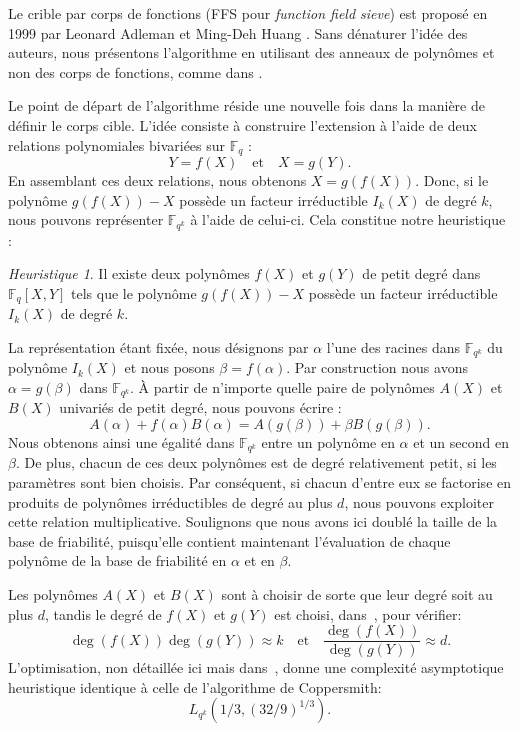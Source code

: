 \documentclass[a4paper, titlepage, 11pt]{article}
\theoremstyle{definition}
\theoremstyle{remark}
\newtheorem{heur}[theo]{Heuristique}
\def\gf #1{\mathbb{F}_{#1}}
\begin{document}
Le crible par corps de fonctions (FFS pour \textit{function field sieve}) est proposé en 1999 par Leonard Adleman et Ming-Deh Huang \cite{adleman1999}. Sans dénaturer l'idée des auteurs, nous présentons l'algorithme en utilisant des anneaux de polynômes et non des corps de fonctions, comme dans \cite{joux2013, joux2006, joux2002, pierrot2016}.

Le point de départ de l'algorithme réside une nouvelle fois dans la manière de définir le corps cible. L'idée consiste à construire l'extension à l'aide de deux relations polynomiales bivariées sur $\gf{q}$ : $$Y = f(X) \quad \text{et}\quad X = g(Y).$$
En assemblant ces deux relations, nous obtenons $X = g(f(X))$. Donc, si le polynôme $g(f(X)) - X$ possède un facteur irréductible $I_k(X)$ de degré $k$, nous pouvons représenter $\gf{q^k}$ à l'aide de celui-ci. Cela constitue notre heuristique :
\begin{heur}
Il existe deux polynômes $f(X)$ et $g(Y)$ de petit degré dans $\gf{q}[X, Y]$ tels que le polynôme $g(f(X)) - X$ possède un facteur irréductible $I_k(X)$ de degré $k$.
\end{heur}
La représentation étant fixée, nous désignons par $\alpha$ l'une des racines dans $\gf{q^k}$ du polynôme $I_k(X)$ et nous posons $\beta = f(\alpha)$. Par construction nous avons $\alpha = g(\beta)$ dans $\gf{q^k}$. À partir de n'importe quelle paire de polynômes $A(X)$ et $B(X)$ univariés de petit degré, nous pouvons écrire :
$$A(\alpha) + f(\alpha)B(\alpha) = A(g(\beta)) + \beta B(g(\beta)).$$
Nous obtenons ainsi une égalité dans $\gf{q^k}$ entre un polynôme en $\alpha$ et un second en $\beta$. De plus, chacun de ces deux polynômes est de degré relativement petit, si les paramètres sont bien choisis. Par conséquent, si chacun d'entre eux se factorise en produits de polynômes irréductibles de degré au plus $d$, nous pouvons exploiter cette relation multiplicative. Soulignons que nous avons ici doublé la taille de la base de friabilité, puisqu'elle contient maintenant l'évaluation de chaque polynôme de la base de friabilité en $\alpha$ et en $\beta$.

Les polynômes $A(X)$ et $B(X)$ sont à choisir de sorte que leur degré soit au plus $d$, tandis le degré de $f(X)$ et $g(Y)$ est choisi, dans~\cite{pierrot2016}, pour vérifier: $$\deg(f(X)) \deg(g(Y)) \approx k \quad\text{et}\quad \frac{\deg(f(X))}{\deg(g(Y))} \approx d.$$
L'optimisation, non détaillée ici mais dans~\cite{pierrot2016}, donne une complexité asymptotique heuristique identique à celle de l'algorithme de Coppersmith:
$$L_{q^k}(1/3, (32/9)^{1/3}).$$
\end{document}
